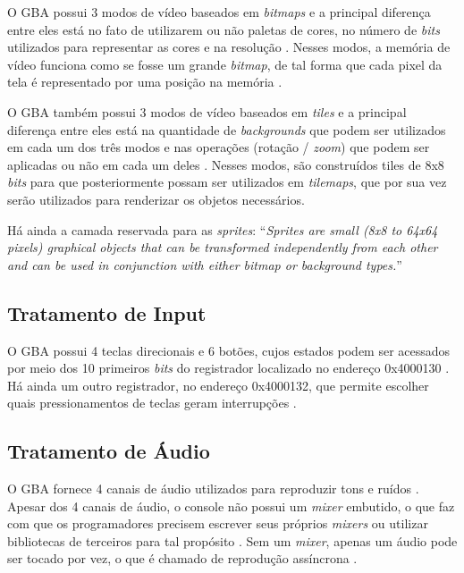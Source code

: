O GBA possui 3 modos de vídeo baseados em \textit{bitmaps} e a principal diferença entre eles está no fato de utilizarem ou não paletas de cores, no número de \textit{bits} utilizados para representar as cores e na resolução \cite{harbour}. Nesses modos, a memória de vídeo funciona como se fosse um grande \textit{bitmap}, de tal forma que cada pixel da tela é representado por uma posição na memória \cite{tonc}.

O GBA também possui 3 modos de vídeo baseados em \textit{tiles} e a principal diferença entre eles está na quantidade de \textit{backgrounds} que podem ser utilizados em cada um dos três modos e nas operações (rotação / \textit{zoom}) que podem ser aplicadas ou não em cada um deles \cite{harbour}. Nesses modos, são construídos tiles de 8x8 \textit{bits} para que posteriormente possam ser utilizados em \textit{tilemaps}, que por sua vez serão utilizados para renderizar os objetos necessários. \cite{tonc}

Há ainda a camada reservada para as \textit{sprites}: ``\textit{Sprites are small (8x8 to 64x64 pixels) graphical objects that can be transformed independently from each other and can be used in conjunction with either bitmap or background types.}'' \cite[p. 38]{tonc}

\subsection{Tratamento de Input}

O GBA possui 4 teclas direcionais e 6 botões, cujos estados podem ser acessados por meio dos 10 primeiros \textit{bits} do registrador localizado no endereço 0x4000130 \cite{gbatek}. Há ainda um outro registrador, no endereço 0x4000132, que permite escolher quais pressionamentos de teclas geram interrupções \cite{cowbite}.

\subsection{Tratamento de Áudio}

O GBA fornece 4 canais de áudio utilizados para reproduzir tons e ruídos \cite{gbatek}. Apesar dos 4 canais de áudio, o console não possui um \textit{mixer} embutido, o que faz com que os programadores precisem escrever seus próprios \textit{mixers} ou utilizar bibliotecas de terceiros para tal propósito \cite{harbour}. Sem um \textit{mixer}, apenas um áudio pode ser tocado por vez, o que é chamado de reprodução assíncrona \cite{harbour}.

